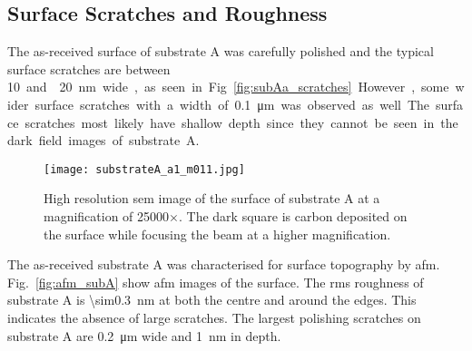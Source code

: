 
\subsection{Surface Scratches and Roughness}
The as-received surface of substrate A was carefully polished and the typical surface scratches are between \SI{10} and {}\SI{20}{\nano\metre} wide, as seen in Fig.~\ref{fig:subAa_scratches}. However, some wider surface scratches with a width of \SI{0.1}{\micro\metre} was observed as well. The surface scratches most likely have shallow depth since they cannot be seen in the dark field images of substrate A.

\begin{figure}[htbp]
    \centering
    \texttt{[image: substrateA\_a1\_m011.jpg]}
    \caption[\Ac{sem} image of surface scratches on substrate A.]{High resolution \acf{sem} image of the surface of substrate A at a magnification of 25000$\times$. The dark square is carbon deposited on the surface while focusing the beam at a higher magnification.}\label{fig:subAa_scratches}
    \label{fig:SEM_A_surface}
\end{figure}

The as-received substrate A was characterised for surface topography by \ac{afm}. Fig.~\ref{fig:afm_subA} show \ac{afm} images of the surface. The \ac{rms} roughness of substrate A is \SI{\sim0.3}{\nano\metre} at both the centre and around the edges. This indicates the absence of large scratches. The largest polishing scratches on substrate A are \SI{0.2}{\micro\metre} wide and \SI{1}{\nano\metre} in depth.


